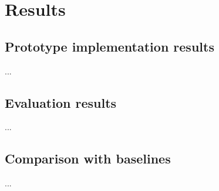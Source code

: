 \chapter{Results}

\section{Prototype implementation results}
...

\section{Evaluation results}
...

\section{Comparison with baselines}
...
